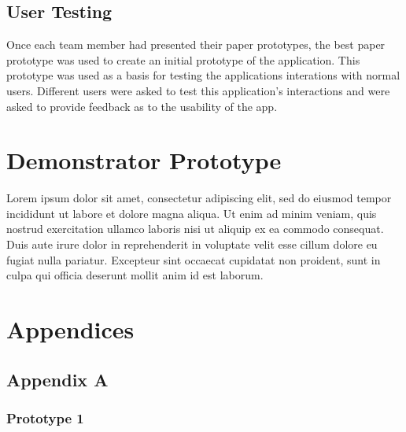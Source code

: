 \documentclass[a4,10pt,twocolumn]{article}
\begin{document}
\subsection*{User Testing}

Once each team member had presented their paper prototypes, the best paper prototype was used to create an initial prototype of the application. This prototype was used as a basis for testing the applications interations with normal users. Different users were asked to test this application's interactions and were asked to provide feedback as to the usability of the app.
\section*{Demonstrator Prototype}

Lorem ipsum dolor sit amet, consectetur adipiscing elit, sed do eiusmod tempor incididunt ut labore et dolore magna aliqua. Ut enim ad minim veniam, quis nostrud exercitation ullamco laboris nisi ut aliquip ex ea commodo consequat. Duis aute irure dolor in reprehenderit in voluptate velit esse cillum dolore eu fugiat nulla pariatur. Excepteur sint occaecat cupidatat non proident, sunt in culpa qui officia deserunt mollit anim id est laborum.

\section*{Appendices}
\subsection*{Appendix A}
\subsubsection*{Prototype 1}
\end{document}
